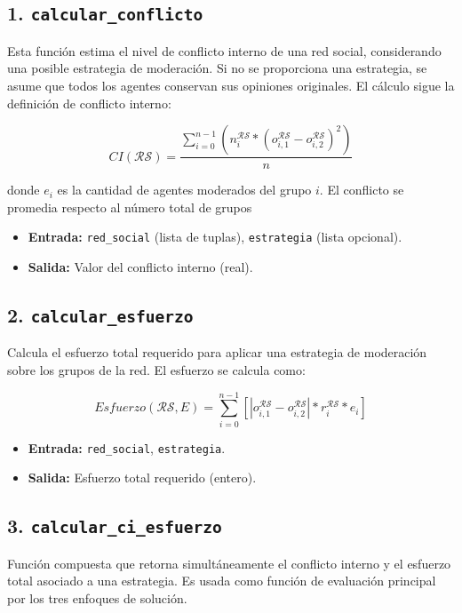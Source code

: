 \documentclass[11pt,letter]{article}
\begin{document}
    \subsection*{1. \texttt{calcular\_conflicto}}
        Esta función estima el nivel de conflicto interno de una red social, considerando una posible estrategia de moderación. Si no se proporciona una estrategia, se asume que todos los agentes conservan sus opiniones originales. El cálculo sigue la definición de conflicto interno:
        
        \[
        CI(\mathcal{RS}) = \frac{\sum_{i=0}^{n-1} \left(n_i^\mathcal{RS} \ast \left(o_{i,1}^\mathcal{RS} - o_{i,2}^\mathcal{RS}\right)^2\right)}{n}
        \]
        
        donde $e_i$ es la cantidad de agentes moderados del grupo $i$. El conflicto se promedia respecto al número total de grupos
        
        \begin{itemize}
          \item \textbf{Entrada:} \texttt{red\_social} (lista de tuplas), \texttt{estrategia} (lista opcional).
          \item \textbf{Salida:} Valor del conflicto interno (real).
        \end{itemize}
    
    \subsection*{2. \texttt{calcular\_esfuerzo}}
        Calcula el esfuerzo total requerido para aplicar una estrategia de moderación sobre los grupos de la red. El esfuerzo se calcula como:
        
        \[
Esfuerzo(\mathcal{RS}, E) = \sum_{i=0}^{n-1} \left[ \left| o^{\mathcal{RS}}_{i,1} - o^{\mathcal{RS}}_{i,2} \right| * r^{\mathcal{RS}}_i * e_i \right]
\]

        
        \begin{itemize}
          \item \textbf{Entrada:} \texttt{red\_social}, \texttt{estrategia}.
          \item \textbf{Salida:} Esfuerzo total requerido (entero).
        \end{itemize}
    
    \subsection*{3. \texttt{calcular\_ci\_esfuerzo}}
        \label{sec:calcular_ci_esfuerzo}
        Función compuesta que retorna simultáneamente el conflicto interno y el esfuerzo total asociado a una estrategia. Es usada como función de evaluación principal por los tres enfoques de solución.
        
\end{document}
